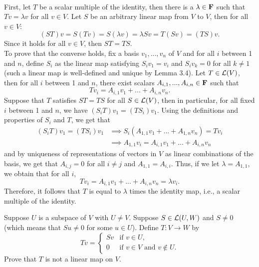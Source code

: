 \begin{solution}
    \\ First, let $T$ be a scalar multiple of the identity, then there is a $\lambda \in \mathbf{F}$ such that $Tv = \lambda v$ for all $v \in V$. Let $S$ be an arbitrary linear map from $V$ to $V$, then for all $v \in V$:
    $$(ST)v = S(Tv) = S(\lambda v) = \lambda Sv = T(Sv) = (TS)v.$$
    Since it holds for all $v \in V$, then $ST = TS$. \\
    To prove that the converse holds, fix a basis $v_1, ..., v_n$ of $V$ and for all $i$ between 1 and $n$, define $S_i$ as the linear map satisfying $S_iv_1 = v_i$ and $S_i v_k = 0$ for all $k \neq 1$ (such a linear map is well-defined and unique by Lemma 3.4). Let $T \in \mathcal{L}(V)$, then for all $i$ between 1 and $n$, there exist scalars $A_{i,1}, ..., A_{i,n} \in \mathbf{F}$ such that
    $$Tv_i = A_{i,1}v_1 + ... + A_{i,n}v_n. $$
    Suppose that $T$ satisfies $ST = TS$ for all $S \in \mathcal{L}(V)$, then in particular, for all fixed $i$ between 1 and $n$, we have $(S_i T)v_1 = (T S_i)v_1$. Using the definitions and properties of $S_i$ and $T$, we get that
    \begin{align*}
        (S_i T)v_1 = (T S_i)v_1 &\implies S_i(A_{1,1}v_1 + ... + A_{1,n}v_n) = T v_i \\
        &\implies A_{1,1}v_i = A_{i,1}v_1 + ... + A_{i,n}v_n
    \end{align*}
    and by uniqueness of representations of vectors in $V$ as linear combinations of the basis, we get that $A_{i,j} = 0$ for all $i \neq j$ and $A_{1,1} = A_{i,i}$. Thus, if we let $\lambda = A_{1,1}$, we obtain that for all $i$,
    $$Tv_i = A_{i,1}v_1 + ... + A_{i,n}v_n = \lambda v_i.$$
    Therefore, it follows that $T$ is equal to $\lambda$ times the identity map, i.e., a scalar multiple of the identity. \\
\end{solution}

\begin{exercise}
    Suppose $U$ is a subspace of $V$ with $U \neq V$. Suppose $S \in \mathcal{L}(U,W)$ and $S \neq 0$ (which means that $Su \neq 0$ for some $u \in U$). Define $T : V \to W$ by
    $$Tv = \begin{cases} Sv & \text{if } v \in U, \\ 0 & \text{if } v \in V \text{ and } v \notin U. \end{cases}$$
    Prove that $T$ is not a linear map on $V$. \\
\end{exercise}


